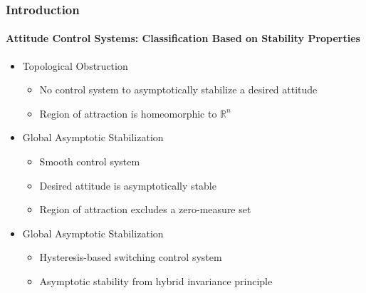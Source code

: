 \documentclass[11pt,professionalfonts,hyperref={pdftex,pdfpagemode=none,pdfstartview=FitH}]{beamer}
\renewcommand{\Re}{\ensuremath{\mathbb{R}}}
\renewcommand{\emph}[1]{\textit{\textbf{\color{blue}{#1}}}}
\begin{document}
\begin{frame}
\frametitle{Introduction}
\framesubtitle{Attitude Control Systems: Classification Based on Stability Properties}

\begin{itemize}
	\item Topological Obstruction
	\begin{itemize}
	\item No \emph{smooth} control system to \emph{globally} asymptotically stabilize a desired attitude
	\item Region of attraction is homeomorphic to $\Re^n$
	\end{itemize}
\vspace*{0.3cm}\pause
	\item \emph{Almost} Global Asymptotic Stabilization
	\begin{itemize}
	\item Smooth control system
	\item Desired attitude is asymptotically stable
	\item Region of attraction excludes a zero-measure set
	\end{itemize}
\vspace*{0.3cm}\pause
	\item \emph{Hybrid} Global Asymptotic Stabilization
	\begin{itemize}
	\item Hysteresis-based switching control system
	\item Asymptotic stability from hybrid invariance principle
	\end{itemize}
\end{itemize}

\end{frame}
\end{document}
